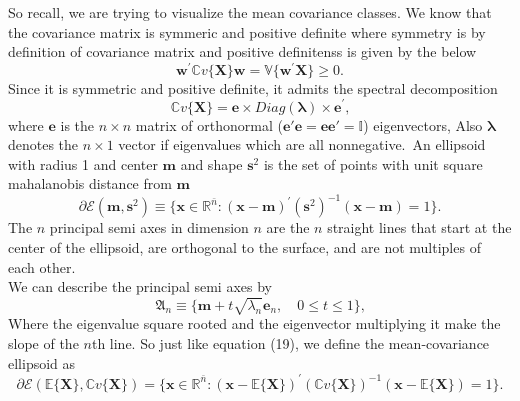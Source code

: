 \documentclass{article}
\theoremstyle{definition}
\theoremstyle{remark}
\begin{document}
\par So recall, we are trying to visualize the mean covariance classes. 
We know that the covariance matrix is symmeric and positive definite 
where symmetry is by definition of covariance matrix and positive definitenss is given by the below
\begin{equation}
    \boldsymbol{w}^{\prime}\mathbb{C}v\{\boldsymbol{X}\}\boldsymbol{w}=\mathbb{V}\{\boldsymbol{w}^{\prime}\boldsymbol{X}\}\geq0\text{.}
    \end{equation}
Since it is symmetric and positive definite, it admits the spectral decomposition
\begin{equation}
    \mathbb{C}v\{\boldsymbol{X}\}=\boldsymbol{e}\times\mathit{Diag}(\boldsymbol{\lambda})\times\boldsymbol{e}^{\prime}\text{,}
    \end{equation}
where $\mathbf{e}$ is the $n \times n$ matrix
of orthonormal ($\mathbf{e'e}=\mathbf{ee'}=\mathbb{I}$) eigenvectors, Also
$\mathbf{\lambda}$ denotes the $n\times 1$ vector if eigenvalues
which are all nonnegative.\
An ellipsoid with radius 1 and center $\mathbf{m}$ and shape $\mathbf{s}^2$
is the set of points with unit square
mahalanobis distance from $\mathbf{m}$
\begin{equation}
    \partial\mathcal{E}(\boldsymbol{m},\boldsymbol{s}^{2})\equiv\{\boldsymbol{x}\in\mathbb{R}^{\bar{n}}:(\boldsymbol{x}-\boldsymbol{m})^{\prime}(\boldsymbol{s}^{2})^{-1}(\boldsymbol{x}-\boldsymbol{m})=1\}\text{.}
    \end{equation}
The $n$ principal semi axes in dimension $n$ are 
the $n$ straight lines that start at the center of the ellipsoid,
are orthogonal to the surface, and are not multiples of each other. \\
We can describe the principal semi axes by 
\begin{equation}
    \mathfrak{A}_{n}\equiv\{\boldsymbol{m}+t\sqrt{\lambda_{n}}\boldsymbol{e}_{n},\quad0\leq t\leq1\}\text{,}
    \end{equation}
Where the eigenvalue square rooted and the eigenvector multiplying it 
make the slope of the $n$th line. 
So just like equation (19), we define the mean-covariance ellipsoid 
as 
\begin{equation}
    \partial\mathcal{E}(\mathbb{E}\{\boldsymbol{X}\},\mathbb{C}v\{\boldsymbol{X}\})=\{\boldsymbol{x}\in\mathbb{R}^{\bar{n}}:(\boldsymbol{x}-\mathbb{E}\{\boldsymbol{X}\})^{\prime}(\mathbb{C}v\{\boldsymbol{X}\})^{-1}(\boldsymbol{x}-\mathbb{E}\{\boldsymbol{X}\})=1\}\text{.}
    \end{equation}
\end{document}
